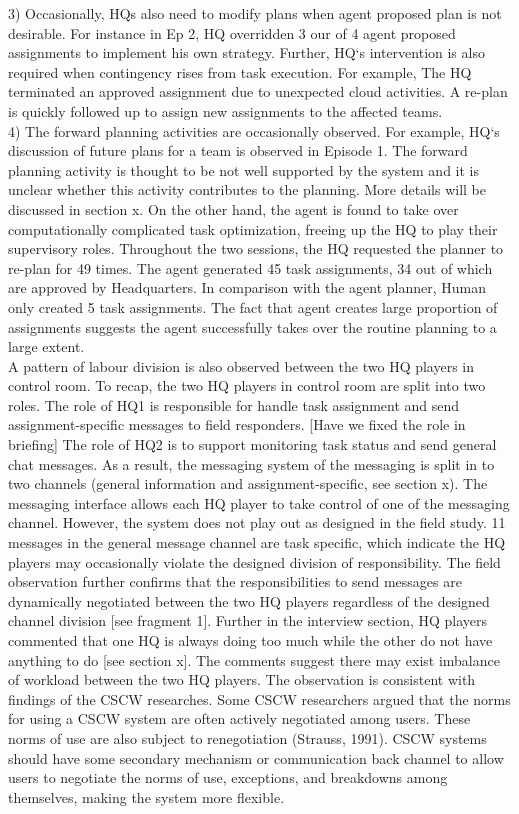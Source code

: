 3) Occasionally, HQs also need to modify plans when agent proposed plan is not desirable. For instance in Ep 2, HQ overridden 3 our of 4 agent proposed assignments to implement his own strategy. Further, HQ`s intervention is also required when contingency rises from task execution. For example, The HQ terminated an approved assignment due to unexpected cloud activities. A re-plan is quickly followed up to assign new assignments to the affected teams.\\ 

4) The forward planning activities are occasionally observed. For example, HQ`s discussion of future plans for a team is observed in Episode 1. The forward planning activity is thought to be not well supported by the system and it is unclear whether this activity contributes to the planning. More details will be discussed in section x. On the other hand, the agent is found to take over computationally complicated task optimization, freeing up the HQ to play their supervisory roles. Throughout the two sessions, the HQ requested the planner to re-plan for 49 times. The agent generated 45 task assignments, 34 out of which are approved by Headquarters. In comparison with the agent planner, Human only created 5 task assignments. The fact that agent creates large proportion of assignments suggests the agent successfully takes over the routine planning to a large extent. \\

A pattern of labour division is also observed between the two HQ players in control room. To recap, the two HQ players in control room are split into two roles. The role of HQ1 is responsible for handle task assignment and send assignment-specific messages to field responders. [Have we fixed the role in briefing] The role of HQ2 is to support monitoring task status and send general chat messages. As a result, the messaging system of the messaging is split in to two channels (general information and assignment-specific, see section x). The messaging interface allows each HQ player to take control of one of the messaging channel.  However, the system does not play out as designed in the field study. 11 messages in the general message channel are task specific, which indicate the HQ players may occasionally violate the designed division of responsibility. The field observation further confirms that the responsibilities to send messages are dynamically negotiated between the two HQ players regardless of the designed channel division [see fragment 1]. Further in the interview section, HQ players commented that one HQ is always doing too much while the other do not have anything to do [see section x]. The comments suggest there may exist imbalance of workload between the two HQ players. The observation is consistent with findings of the CSCW researches. Some CSCW researchers argued that the norms for using a CSCW system are often actively negotiated among users. These norms of use are also subject to renegotiation (Strauss, 1991). CSCW systems should have some secondary mechanism or communication back channel to allow users to negotiate the norms of use, exceptions, and breakdowns among themselves, making the system more flexible.

